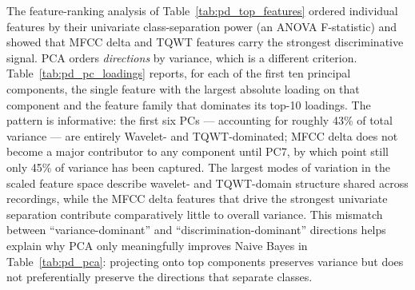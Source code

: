 \documentclass[11pt,a4paper]{article}
\begin{document}
The feature-ranking analysis of Table~\ref{tab:pd_top_features} ordered
individual features by their univariate class-separation power (an ANOVA
F-statistic) and showed that MFCC delta and TQWT features carry the strongest
discriminative signal. PCA orders \emph{directions} by variance, which is a
different criterion. Table~\ref{tab:pd_pc_loadings} reports, for each of the
first ten principal components, the single feature with the largest absolute
loading on that component and the feature family that dominates its top-10
loadings. The pattern is informative: the first six PCs --- accounting for
roughly 43\% of total variance --- are entirely Wavelet- and TQWT-dominated;
MFCC delta does not become a major contributor to any component until PC7,
by which point still only 45\% of variance has been captured. The largest
modes of variation in the scaled feature space describe wavelet- and
TQWT-domain structure shared across recordings, while the MFCC delta
features that drive the strongest univariate separation contribute
comparatively little to overall variance. This mismatch between
``variance-dominant'' and ``discrimination-dominant'' directions helps
explain why PCA only meaningfully improves Naive Bayes in
Table~\ref{tab:pd_pca}: projecting onto top components preserves variance
but does not preferentially preserve the directions that separate classes.
\end{document}
